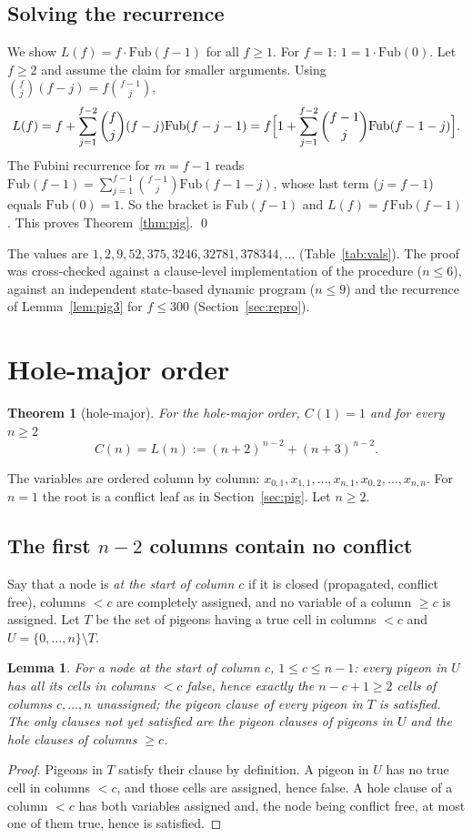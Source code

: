 \documentclass[11pt]{article}
\newtheorem{theorem}{Theorem}
\newtheorem{lemma}{Lemma}
\theoremstyle{definition}
\theoremstyle{remark}
\newcommand{\Fub}{\mathrm{Fub}}
\begin{document}
\subsection{Solving the recurrence}
We show $L(f)=f\cdot\Fub(f-1)$ for all $f\ge1$. For $f=1$: $1=1\cdot\Fub(0)$. Let $f\ge2$ and assume the claim
for smaller arguments. Using $\binom fj(f-j)=f\binom{f-1}j$,
\[
L(f)=f+\sum_{j=1}^{f-2}\binom fj (f-j)\Fub(f-j-1)=f\Bigl[1+\sum_{j=1}^{f-2}\binom{f-1}j\Fub(f-1-j)\Bigr].
\]
The Fubini recurrence for $m=f-1$ reads $\Fub(f-1)=\sum_{j=1}^{f-1}\binom{f-1}j\Fub(f-1-j)$, whose last
term ($j=f-1$) equals $\Fub(0)=1$. So the bracket is $\Fub(f-1)$ and $L(f)=f\,\Fub(f-1)$. This
proves Theorem~\ref{thm:pig}. \qed

The values are $1,2,9,52,375,3246,32781,378344,\dots$ (Table~\ref{tab:vals}). The proof was
cross-checked against a clause-level implementation of the procedure ($n\le6$), against an
independent state-based dynamic program ($n\le9$) and the recurrence of Lemma~\ref{lem:pig3} for $f\le300$
(Section~\ref{sec:repro}).

\section{Hole-major order}\label{sec:hole}

\begin{theorem}[hole-major]\label{thm:hole}
For the hole-major order, $C(1)=1$ and for every $n\ge2$
\[
C(n)=L(n):=(n+2)^{\,n-2}+(n+3)^{\,n-2}.
\]
\end{theorem}

The variables are ordered column by column: $x_{0,1},x_{1,1},\dots,x_{n,1},x_{0,2},\dots,x_{n,n}$.
For $n=1$ the root is a conflict leaf as in Section~\ref{sec:pig}. Let $n\ge2$.

\subsection{The first $n-2$ columns contain no conflict}
Say that a node is \emph{at the start of column $c$} if it is closed (propagated, conflict free),
columns $<c$ are completely assigned, and no variable of a column $\ge c$ is assigned. Let $T$ be the set of
pigeons having a true cell in columns $<c$ and $U=\{0,\dots,n\}\setminus T$.

\begin{lemma}\label{lem:h1}
For a node at the start of column $c$, $1\le c\le n-1$: every pigeon in $U$ has all its cells in columns $<c$
false, hence exactly the $n-c+1\ge2$ cells of columns $c,\dots,n$ unassigned; the pigeon clause of
every pigeon in $T$ is satisfied. The only clauses not yet satisfied are the pigeon clauses of
pigeons in $U$ and the hole clauses of columns $\ge c$.
\end{lemma}
\begin{proof}
Pigeons in $T$ satisfy their clause by definition. A pigeon in $U$ has no true cell in columns $<c$, and
those cells are assigned, hence false. A hole clause of a column $<c$
has both variables assigned and, the node being conflict free, at most one of them true, hence is satisfied.
\end{proof}
\end{document}
